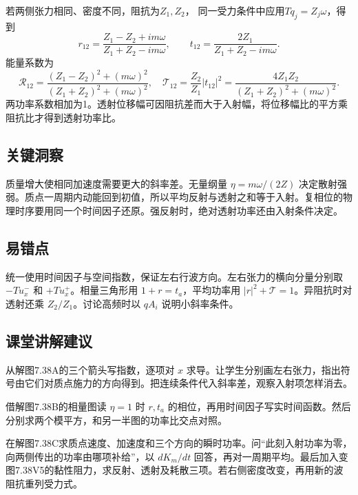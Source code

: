 \documentclass[UTF8,fontset=fandol,a4paper,11pt]{ctexart}
\begin{document}
若两侧张力相同、密度不同，阻抗为$Z_1,Z_2$，
同一受力条件中应用$Tq_j=Z_j\omega$，得到
\[
r_{12}=\frac{Z_1-Z_2+im\omega}{Z_1+Z_2-im\omega},\qquad
t_{12}=\frac{2Z_1}{Z_1+Z_2-im\omega}.
\]
能量系数为
\[
\mathcal R_{12}=\frac{(Z_1-Z_2)^2+(m\omega)^2}{(Z_1+Z_2)^2+(m\omega)^2},\quad
\mathcal T_{12}=\frac{Z_2}{Z_1}|t_{12}|^2
=\frac{4Z_1Z_2}{(Z_1+Z_2)^2+(m\omega)^2}.
\]
两功率系数相加为1。透射位移幅可因阻抗差而大于入射幅，将位移幅比的平方乘阻抗比才得到透射功率比。




\subsection*{关键洞察}

质量增大使相同加速度需要更大的斜率差。无量纲量 $\eta=m\omega/(2Z)$ 决定散射强弱。质点一周期内动能回到初值，所以平均反射与透射之和等于入射。复相位的物理时序要用同一个时间因子还原。强反射时，绝对透射功率还由入射条件决定。




\subsection*{易错点}

统一使用时间因子与空间指数，保证左右行波方向。左右张力的横向分量分别取 $-Tu_x^-$ 和 $+Tu_x^+$。相量三角形用 $1+r=t_a$，平均功率用 $|r|^2+\mathcal T=1$。异阻抗时对透射还乘 $Z_2/Z_1$。讨论高频时以 $qA_i$ 说明小斜率条件。




\subsection*{课堂讲解建议}

从解图7.38A的三个箭头写指数，逐项对 $x$ 求导。让学生分别画左右张力，指出符号由它们对质点施力的方向得到。把连续条件代入斜率差，观察入射项怎样消去。

借解图7.38B的相量图读 $\eta=1$ 时 $r,t_a$ 的相位，再用时间因子写实时间函数。然后分别求两个模平方，和另一半图的功率比交点对照。

在解图7.38C求质点速度、加速度和三个方向的瞬时功率。问“此刻入射功率为零，向两侧传出的功率由哪项补给”，以 $dK_m/dt$ 回答，再对一周期平均。最后加入变图7.38V5的黏性阻力，求反射、透射及耗散三项。若右侧密度改变，再用新的波阻抗重列受力式。
\end{document}
